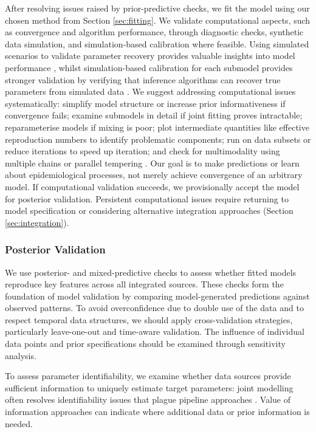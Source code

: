 \documentclass{article}
\begin{document}
After resolving issues raised by prior-predictive checks, we fit the model using our chosen method from Section \ref{sec:fitting}. We validate computational aspects, such as convergence and algorithm performance, through diagnostic checks, synthetic data simulation, and simulation-based calibration where feasible.
Using simulated scenarios to validate parameter recovery provides valuable insights into model performance \citep{bouman2024bayesian}, whilst simulation-based calibration for each submodel provides stronger validation by verifying that inference algorithms can recover true parameters from simulated data \citep{talts2018validating}.
We suggest addressing computational issues systematically: simplify model structure or increase prior informativeness if convergence fails; examine submodels in detail if joint fitting proves intractable; reparameterise models if mixing is poor; plot intermediate quantities like effective reproduction numbers to identify problematic components; run on data subsets or reduce iterations to speed up iteration; and check for multimodality using multiple chains or parallel tempering \citep{gelman2020bayesian}.
Our goal is to make predictions or learn about epidemiological processes, not merely achieve convergence of an arbitrary model. 
If computational validation succeeds, we provisionally accept the model for posterior validation.
Persistent computational issues require returning to model specification or considering alternative integration approaches (Section \ref{sec:integration}).

\subsubsection{Posterior Validation}

We use posterior- and mixed-predictive checks \citep{rubin1984bayesianly,gelman1995bayesian} to assess whether fitted models reproduce key features across all integrated sources.
These checks form the foundation of model validation by comparing model-generated predictions against observed patterns.
To avoid overconfidence due to double use of the data and to respect temporal data structures, we should apply cross-validation strategies, particularly leave-one-out and time-aware validation.
The influence of individual data points and prior specifications should be examined through sensitivity analysis.

To assess parameter identifiability, we examine whether data sources provide sufficient information to uniquely estimate target parameters: joint modelling often resolves identifiability issues that plague pipeline approaches \citep{lison2024generative, russell2024combined}. Value of information approaches \citep{jackson2019value,heath2024value} can indicate where additional data or prior information is needed.  
\end{document}
